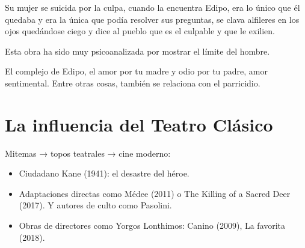 Su mujer se suicida por la culpa, cuando la encuentra Edipo, era lo único que él quedaba y era la única que podía resolver sus preguntas, se clava alfileres en los ojos quedándose ciego y dice al pueblo que es el culpable y que le exilien.

Esta obra ha sido muy psicoanalizada por mostrar el límite del hombre.

El complejo de Edipo, el amor por tu madre y odio por tu padre, amor sentimental. Entre otras cosas, también se relaciona con el parricidio.
\pagebreak

\section{La influencia del Teatro Clásico}
Mitemas → topos teatrales → cine moderno:
\begin{itemize}
    \item Ciudadano Kane (1941): el desastre del héroe.
    \item Adaptaciones directas como Médee (2011) o The Killing of a Sacred Deer (2017). Y autores de culto como Pasolini.
    \item Obras de directores como Yorgos Lonthimos: Canino (2009), La favorita (2018).
\end{itemize}